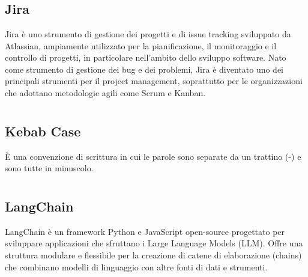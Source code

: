 
\section{}

\subsection*{Jira}
Jira è uno strumento di gestione dei progetti e di issue tracking sviluppato da Atlassian, ampiamente utilizzato per la pianificazione, il monitoraggio e 
il controllo di progetti, in particolare nell'ambito dello sviluppo software. Nato come strumento di gestione dei bug e dei problemi, Jira è diventato uno 
dei principali strumenti per il project management, soprattutto per le organizzazioni che adottano metodologie agili come Scrum e Kanban.

\newpage



\section{}

\hypertarget{sec:Kebab Case}{}
\subsection*{Kebab Case}
È una convenzione di scrittura in cui le parole sono separate da un trattino (-) e sono tutte in minuscolo.

\newpage



\section{}

\hypertarget{sec:langchain}{}
\subsection*{LangChain}
LangChain è un framework Python e JavaScript open-source progettato per sviluppare applicazioni che sfruttano i Large Language Models 
(LLM). Offre una struttura modulare e flessibile per la creazione di catene di elaborazione (chains) che combinano modelli di 
linguaggio con altre fonti di dati e strumenti.

